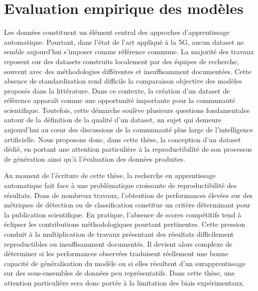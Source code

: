 \documentclass[a4paper,11pt,twoside]{StyleThese}
\begin{document}
\dominitoc
\faketableofcontents
\fi

\chapter{Evaluation empirique des modèles}
\minitoc

Les données constituent un élément central des approches d’apprentissage automatique. Pourtant, dans l’état de l’art appliqué à la 5G, aucun dataset ne semble aujourd’hui s’imposer comme référence commune. La majorité des travaux reposent sur des datasets construits localement par des équipes de recherche, souvent avec des méthodologies différentes et insuffisamment documentées. Cette absence de standardisation rend difficile la comparaison objective des modèles proposés dans la littérature. Dans ce contexte, la création d’un dataset de référence apparaît comme une opportunité importante pour la communauté scientifique. Toutefois, cette démarche soulève plusieurs questions fondamentales autour de la définition de la qualité d’un dataset, un sujet qui demeure aujourd’hui au cœur des discussions de la communauté plus large de l’intelligence artificielle. Nous proposons donc, dans cette thèse, la conception d’un dataset dédié, en portant une attention particulière à la reproductibilité de son processus de génération ainsi qu'à l'évaluation des données produites.


Au moment de l’écriture de cette thèse, la recherche en apprentissage automatique fait face à une problématique croissante de reproductibilité des résultats. Dans de nombreux travaux, l’obtention de performances élevées sur des métriques de détection ou de classification constitue un critère déterminant pour la publication scientifique. En pratique, l’absence de scores compétitifs tend à éclipser les contributions méthodologiques pourtant pertinentes. Cette pression conduit à la multiplication de travaux présentant des résultats difficilement reproductibles ou insuffisamment documentés. Il devient alors complexe de déterminer si les performances observées traduisent réellement une bonne capacité de généralisation du modèle ou si elles résultent d’un surapprentissage sur des sous-ensembles de données peu représentatifs. Dans cette thèse, une attention particulière sera donc portée à la limitation des biais expérimentaux.%
\end{document}
